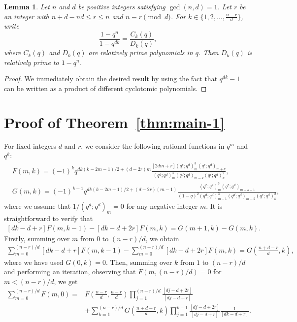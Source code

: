 \documentclass[12pt]{article}
\newtheorem{lem}[thm]{Lemma}
\numberwithin{equation}{section}
\begin{document}
\begin{lem}\label{lem:q-integers-n}
     Let $n$ and $d$ be positive integers satisfying $\gcd(n,d)=1$. Let $r$ be an integer with $n+d-nd\leqslant r \leqslant n$ and 
    $n\equiv r \pmod{d} $. For $k\in \{1,2,\dots,\frac{n-r}{d}\}$, write 
    \[\frac{1-q^{n}}{1-q^{dk}}=\frac{C_k(q)}{D_k(q)},\] where $C_k(q)$ and $D_k(q)$ are relatively prime polynomials in $q$. 
    Then $D_k(q)$ is relatively prime to $1-q^n$.
\end{lem}
\begin{proof}
    We immediately obtain the desired result by using the fact that $q^{dk}-1$ can be written as a product of different 
    cyclotomic polynomials. 
\end{proof}


\section{Proof of Theorem~\ref{thm:main-1}}
For fixed integers $d$ and $r$, we consider the following rational functions in $q^m$ and $q^k$:
\begin{align*}
    &F(m,k)=(-1)^kq^{dk(k-2m-1)/2+(d-2r)m}\frac{[2dm+r](q^r;q^d)^3_m(q^r;q^d)_{m+k}}{(q^d;q^d)^3_m(q^d;q^d)_{m-k}(q^r;q^d)^2_k},\\
    &G(m,k)=(-1)^{k-1}q^{dk(k-2m+1)/2+(d-2r)(m-1)}\frac{(q^r;q^d)^3_m(q^r;q^d)_{m+k-1}}{(1-q)^2(q^d;q^d)^3_{m-1}(q^d;q^d)_{m-k}(q^r;q^d)^2_k},
\end{align*}
where we assume that $1/(q^d;q^d)_m=0$ for any negative integer $m$. 
It is straightforward to verify that
\begin{align}\label{eq:qz}
    [dk-d+r]F(m,k-1)-[dk-d+2r]F(m,k)=G(m+1,k)-G(m,k).
\end{align}
Firstly, summing over $m$ from 0 to $(n-r)/d$, we obtain
\begin{align*}
    \displaystyle
    \sum_{m=0}^{(n-r)/d}[dk-d+r]F(m,k-1)-\sum_{m=0}^{(n-r)/d}[dk-d+2r]F(m,k)=G\left(\frac{n+d-r}{d},k\right),
\end{align*}
where we have used $G(0,k)=0$. Then, summing over $k$ from $1$ to $(n-r)/d$ and performing an iteration, observing that $F(m,(n-r)/d)=0$ for $m<(n-r)/d$,  we get
\begin{align}\label{eq:FG-n}
    \sum_{m=0}^{(n-r)/d}F(m,0)=&F\left(\frac{n-r}{d},\frac{n-r}{d}\right)\prod_{j=1}^{(n-r)/d}\frac{[dj-d+2r]}{[dj-d+r]}\nonumber\\
    &+\sum_{k=1}^{(n-r)/d}G\left(\frac{n+d-r}{d},k\right)\prod_{j=1}^{k-1}\frac{[dj-d+2r]}{[dj-d+r]}\frac{1}{[dk-d+r]}.
\end{align}
\end{document}
